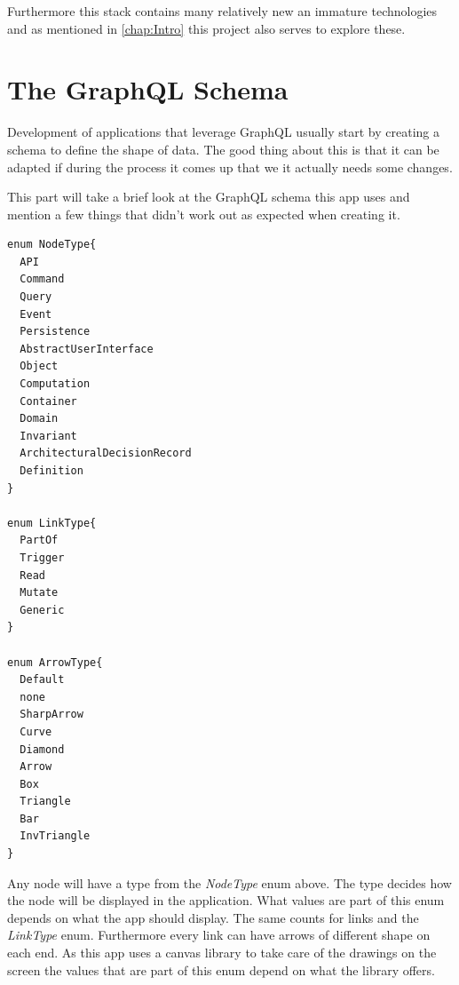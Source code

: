 Furthermore this stack contains many relatively new an immature technologies and as mentioned in \autoref{chap:Intro} this project also serves to explore these.

\section{The GraphQL Schema}
Development of applications that leverage GraphQL usually start by creating a schema to define the shape of data. The good thing about this is that it can be adapted if during the process it comes up that we it actually needs some changes.

This part will take a brief look at the GraphQL schema this app uses and mention a few things that didn't work out as expected when creating it.
\lstset{language=GraphQL}
\begin{lstlisting}[caption={GraphQL Enums},label={enums}]
enum NodeType{
  API
  Command
  Query
  Event
  Persistence
  AbstractUserInterface
  Object
  Computation
  Container
  Domain
  Invariant
  ArchitecturalDecisionRecord
  Definition
}

enum LinkType{
  PartOf
  Trigger
  Read
  Mutate
  Generic
}

enum ArrowType{
  Default
  none
  SharpArrow
  Curve
  Diamond
  Arrow
  Box
  Triangle
  Bar
  InvTriangle
}
\end{lstlisting}
Any node will have a type from the \emph{NodeType} enum above. The type decides how the node will be displayed in the application. What values are part of this enum depends on what the app should display. The same counts for links and the \emph{LinkType} enum. Furthermore every link can have arrows of different shape on each end. As this app uses a canvas library to take care of the drawings on the screen the values that are part of this enum depend on what the library offers.

